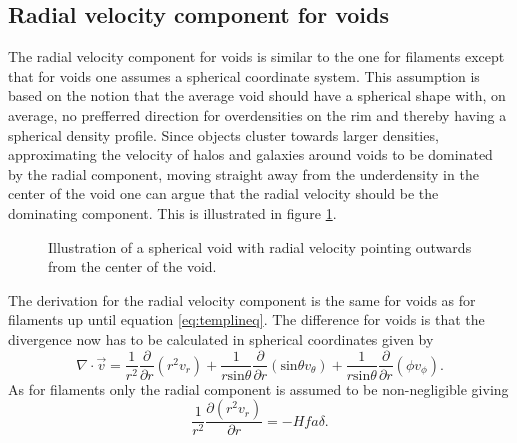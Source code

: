 \subsection{Radial velocity component for voids}
The radial velocity component for voids is similar to the one for filaments
except that for voids one assumes a spherical coordinate system. This assumption
is based on the notion that the average void should have a spherical shape with,
on average, no prefferred direction for overdensities on the rim and
thereby having a spherical density profile. Since objects cluster towards larger
densities, approximating the velocity of halos and galaxies around
voids to be dominated by the radial component, moving straight away from the
underdensity in the center of the void one can argue that the radial velocity
should be the dominating component. This is illustrated in figure \ref{fig:filamentvr}.
\begin{figure}\label{fig:filamentvr}
    \caption{Illustration of a spherical void with radial velocity pointing outwards from the center of the void.}
\end{figure}
The derivation for the radial velocity component is the same for voids as for
filaments up until equation \ref{eq:templineq}. The difference for voids is that
the divergence now has to be calculated in spherical coordinates given by
\begin{equation}
    \nabla\cdot \vec{v}=\frac{1}{r^2}\frac{\partial}{\partial r}(r^2v_r)
                       +\frac{1}{r\mathrm{sin}\theta}\frac{\partial}{\partial r}(\mathrm{sin}\theta v_\theta)
                       +\frac{1}{r\mathrm{sin}\theta}\frac{\partial}{\partial r}(\phi v_\phi).
\end{equation}
As for filaments only the radial component is assumed to be non-negligible
giving
\begin{equation}
    \frac{1}{r^2}\frac{\partial(r^2v_r)}{\partial r}=-Hfa\delta.
\end{equation}
